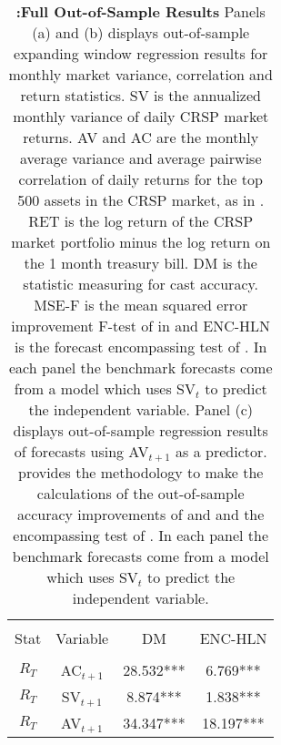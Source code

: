\begin{table}[!htbp]
	\centering \caption{\textbf{:Full Out-of-Sample Results} \newline
		\footnotesize{Panels (a) and (b) displays out-of-sample expanding window regression results for monthly market variance, correlation and return statistics. SV is the annualized monthly variance of daily CRSP market returns. AV and AC are the monthly average variance and average pairwise correlation of daily returns for the top 500 assets in the CRSP market, as in \citet{pollet_average_2010}. RET is the log return of the CRSP market portfolio minus the log return on the 1 month treasury bill. DM is the \citet{Diebold1995} statistic measuring for cast accuracy. MSE-F is the mean squared error improvement F-test of in \citet{mccracken_asymptotics_2007} and ENC-HLN is the forecast encompassing test of \citet{harvey_tests_1998}.} In each panel the benchmark forecasts come from a model which uses SV$_{t}$ to predict the independent variable. Panel (c) displays out-of-sample regression results of forecasts using AV$_{t+1}$ as a predictor. \citet{rossi_out--sample_2012} provides the methodology to make the calculations of the out-of-sample accuracy improvements of \citet{Diebold1995} and \citet{mccracken_asymptotics_2007} and the encompassing test of \citet{harvey_tests_1998}.  In each panel the benchmark forecasts come from a model which uses SV$_{t}$ to predict the independent variable.}
	\label{tab:tab_out_sample}
	\begin{adjustbox}{center,max height=\totalheight}
		
	\end{adjustbox}
	\begin{adjustbox}{center,max height=\totalheight}
		
	\end{adjustbox}
		\begin{adjustbox}{center,max height=\totalheight}
			\begin{tabular}{cccc}
				\hline\\[-1.8ex]
				Stat & Variable & DM & ENC-HLN \\
				\hline\\[-1.8ex]
				$R_{T}$ & AC$_{t+1}$ & 28.532*** & 6.769*** \\
				$R_{T}$ & SV$_{t+1}$ & 8.874*** & 1.838*** \\
				$R_{T}$ & AV$_{t+1}$ & 34.347*** & 18.197*** \\

\end{tabular}
\end{adjustbox}
\end{table}
